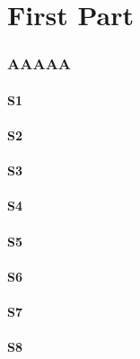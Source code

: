 \documentclass[12pt,a4paper]{article}
\begin{document}
\dosecttoc
\dosectlof[c]                   %
\dosectlot
\doparttoc                      %
\dopartlof                      %
\dopartlot                      %
\faketableofcontents            %
\fakelistoffigures              %
\fakelistoftables               %
\part{First Part}
\parttoc
\partlof[r]
\partlot
\twocolumn\sloppy               %
\section{AAAAA}                 %
\secttoc[r]                     %
\mtcskip \sectlof %
\lipsum[1]
\subsection{S1}
\lipsum[2]
\subsection{S2}
\lipsum[3]
\subsection{S3}
\lipsum[4]
\subsection*{S4}
\lipsum[5]
\subsection{S5}
\lipsum[6]
\subsection{S6}
\lipsum[7]
\subsection{S7}
\lipsum[8]
\subsection{S8}
\lipsum[9]
\end{document}
